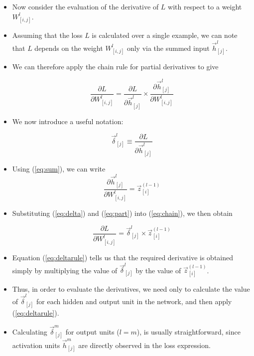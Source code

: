 \begin{itemize}
\item Now consider the evaluation of the derivative of $L$ with respect to a weight
$W_{[i,j]}^l$.

\item Assuming that the loss $L$ is calculated over a single example, we can note that $L$ depends on the weight $W_{[i,j]}^l$ only via the summed input $\vec{h}_{[j]}^{l}$.


\item We can therefore apply the chain rule for partial derivatives to give

\begin{equation}
\frac{\partial L}{\partial W_{[i,j]}^l} = \frac{\partial L}{\partial \vec{h}_{[j]}^{l}} \times \frac{\partial \vec{h}_{[j]}^{l}}{\partial W_{[i,j]}^l}
\label{eq:chain}
\end{equation}

\item We now introduce a useful notation:

\begin{equation}
\vec{\delta}_{[j]}^l \equiv \frac{\partial L}{\partial \vec{h}_{[j]}^l}
\label{eq:delta}
\end{equation}

\item Using (\ref{eq:sum}), we can write
\begin{equation}
\frac{\partial \vec{h}_{[j]}^l}{\partial W_{[i,j]}^l} = \vec{z}_{[i]}^{(l-1)}
\label{eq:part}
\end{equation}

\item Substituting (\ref{eq:delta}) and (\ref{eq:part})  into (\ref{eq:chain}), we then obtain

\begin{equation}
\frac{\partial L}{\partial W_{[i,j]}^l} = \vec{\delta}_{[j]}^l \times \vec{z}_{[i]}^{(l-1)}
\label{eq:deltarule}
\end{equation}

 \item  Equation (\ref{eq:deltarule}) tells us that the required derivative is obtained simply by multiplying the value of $\vec{\delta}_{[j]}^l$ by the value of $\vec{z}_{[i]}^{(l-1)}$.
 
 \item Thus, in order to evaluate the derivatives, we need only to calculate the value of $\vec{\delta}_{[j]}^l$ for each hidden and output unit in the network, and then apply (\ref{eq:deltarule}).
 
 \item Calculating $\vec{\delta}_{[j]}^m$ for output units ($l=m$), is usually straightforward, since activation units $\vec{h}_{[j]}^m$ are directly observed in the loss expression.
 

\end{itemize}
